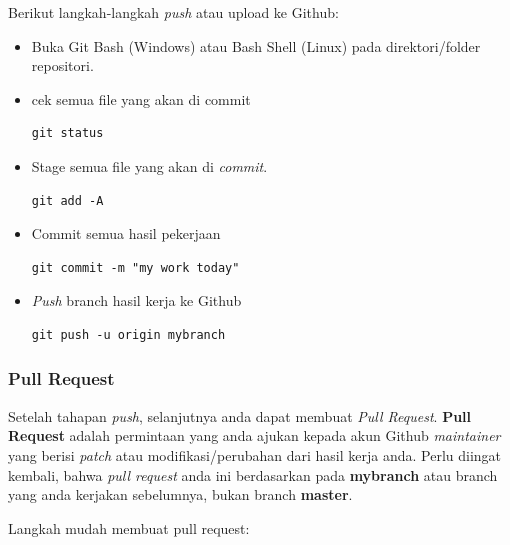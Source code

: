 \documentclass[12pt]{article}
\begin{document}
	Berikut langkah-langkah \textit{push} atau upload ke Github:
	
	\begin{itemize}
		\item Buka Git Bash (Windows) atau Bash Shell (Linux) pada direktori/folder repositori.
		
\newpage
		
		\item cek semua file yang akan di commit
		\begin{verbatim}
git status
		\end{verbatim}
		
		\item Stage semua file yang akan di \textit{commit}.
		\begin{verbatim}
git add -A
		\end{verbatim}
		
		\item Commit semua hasil pekerjaan
		\begin{verbatim}
git commit -m "my work today"
		\end{verbatim}
		
		\item \textit{Push} branch hasil kerja ke Github
		\begin{verbatim}
git push -u origin mybranch
		\end{verbatim}
		
	\end{itemize}

	\subsubsection{Pull Request}
	
	Setelah tahapan \textit{push}, selanjutnya anda dapat membuat \textit{Pull Request}.
	\textbf{Pull Request} adalah permintaan yang anda ajukan kepada akun Github \textit{maintainer} yang berisi \textit{patch} atau modifikasi/perubahan dari hasil kerja anda.
	Perlu diingat kembali, bahwa \textit{pull request} anda ini berdasarkan pada \textbf{mybranch} atau branch yang anda kerjakan sebelumnya, bukan branch \textbf{master}.
	
	Langkah mudah membuat pull request:
	
\end{document}
